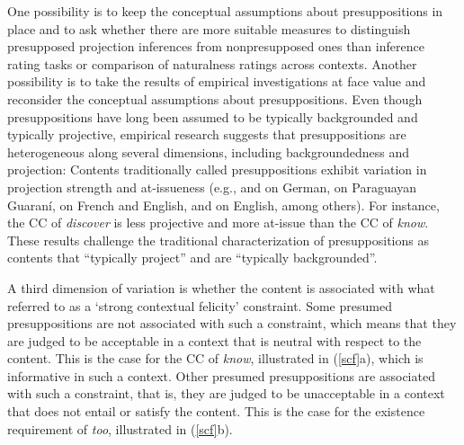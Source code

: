\documentclass[11pt,fleqn]{article}
\newcommand{\6}{\mbox{$[\hspace*{-.6mm}[$}}
\newcommand{\9}{\mbox{$]\hspace*{-.6mm}]$}}
\begin{document}
One possibility is to keep the conceptual assumptions about presuppositions in place and to ask whether there are more suitable measures to distinguish presupposed projection inferences from nonpresupposed ones than inference rating tasks or comparison of naturalness ratings across contexts. Another possibility is to take the results of empirical investigations at face value and reconsider the conceptual assumptions about presuppositions. Even though presuppositions have long been assumed to be typically backgrounded and typically projective, empirical research suggests that presuppositions are heterogeneous along several dimensions, including backgroundedness and projection: Contents traditionally called presuppositions exhibit variation in projection strength and at-issueness (e.g., \citealt{xue-onea11} and \citealt{solstad-bott2024} on German, \citealt{tonhauser-guarani-variability} on Paraguayan Guaran\'i, \citealt{destruel-etal2015} on French and English, and \citealt{smith-hall11,djaerv-etal2018,white-rawlins-nels2018,cummins-etal2019,demarneffe-etal-sub23,tbd-variability,degen-tonhauser-language} on English, among others). For instance, the CC of {\em discover} is less projective and more at-issue than the CC of {\em know}. These results challenge the traditional characterization of presuppositions as contents that ``typically project'' and are ``typically backgrounded''.

A third dimension of variation is whether the content is associated with what \citealt*{brst-lang11} referred to as a `strong contextual felicity' constraint. Some presumed presuppositions are not associated with such a constraint, which means that they are judged to be acceptable in a context that is neutral with respect to the content. This is the case for the CC of {\em know}, illustrated in (\ref{scf}a), which is informative in such a context. Other presumed presuppositions are associated with such a constraint, that is, they are judged to be unacceptable in a context that does not entail or satisfy the content. This is the case for the existence requirement of {\em too}, illustrated in (\ref{scf}b).
\end{document}
